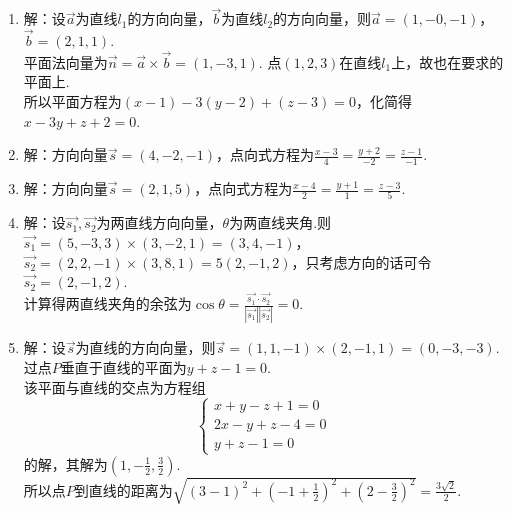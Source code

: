 \begin{enumerate}
	\item 解：设$ \vec{a} $为直线$ l_1 $的方向向量，$ \vec{b} $为直线$ l_2 $的方向向量，则$ \vec{a}=(1,-0,-1) $，$ \vec{b}=(2,1,1) $.\\
平面法向量为$ \vec{n}=\vec{a}\times\vec{b}=(1,-3,1) $. 点$ (1,2,3) $在直线$ l_1 $上，故也在要求的平面上.\\
所以平面方程为$ (x-1)-3(y-2)+(z-3)=0 $，化简得$ x-3y+z+2=0 $.
	\item 解：方向向量$ \vec{s}=(4,-2,-1) $，点向式方程为$ \frac{x-3}{4}=\frac{y+2}{-2}=\frac{z-1}{-1} $.
	\item 解：方向向量$ \vec{s}=(2,1,5) $，点向式方程为$ \frac{x-4}{2}=\frac{y+1}{1}=\frac{z-3}{5} $.
	\item 解：设$ \vec{s_1},\vec{s_2} $为两直线方向向量，$ \theta $为两直线夹角.则$ \vec{s_1}=(5,-3,3)\times(3,-2,1)=(3,4,-1) $，$ \vec{s_2}=(2,2,-1)\times(3,8,1)=5(2,-1,2) $，只考虑方向的话可令$ \vec{s_2}=(2,-1,2) $.\\
计算得两直线夹角的余弦为$ \cos\theta = \frac{\vec{s_1}\cdot\vec{s_2}}{|\vec{s_1}||\vec{s_2}|}=0 $.
	\item 解：设$ \vec{s} $为直线的方向向量，则$ \vec{s}=(1,1,-1)\times(2,-1,1)=(0,-3,-3) $.\\
过点$ P $垂直于直线的平面为$ y+z-1=0 $.\\
该平面与直线的交点为方程组$$ \begin{cases}
x+y-z+1=0 \\
2x-y+z-4=0 \\
y+z-1 =0
\end{cases} $$的解，其解为$ (1,-\frac{1}{2},\frac{3}{2}) $.\\
所以点$ P $到直线的距离为$ \sqrt{(3-1)^2+(-1+\frac{1}{2})^2+(2-\frac{3}{2})^2}=\frac{3\sqrt{2}}{2} $.
\end{enumerate}

